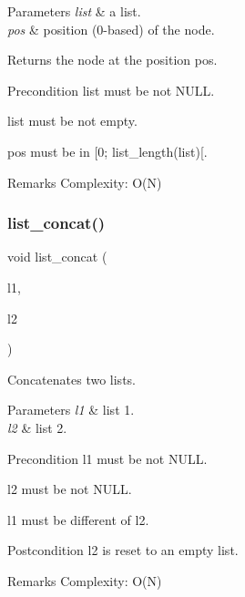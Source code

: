 \begin{DoxyParams}{Parameters}
{\em list} & a list. \\
\hline
{\em pos} & position (0-\/based) of the node. \\
\hline
\end{DoxyParams}
\begin{DoxyReturn}{Returns}
the node at the position {\ttfamily pos}.
\end{DoxyReturn}
\begin{DoxyPrecond}{Precondition}
{\ttfamily list} must be not N\+U\+LL. 

{\ttfamily list} must be not empty. 

{\ttfamily pos} must be in [0; list\+\_\+length(list)[.
\end{DoxyPrecond}
\begin{DoxyRemark}{Remarks}
Complexity\+: O(\+N) 
\end{DoxyRemark}
\mbox{\label{list_8h_af71fffc666f138957b1e015fdae5fe1f}} 
\subsubsection{list\+\_\+concat()}
{\footnotesize\ttfamily void list\+\_\+concat (\begin{DoxyParamCaption}\item[{struct \textbf{ list} $\ast$}]{l1,  }\item[{struct \textbf{ list} $\ast$}]{l2 }\end{DoxyParamCaption})\hspace{0.3cm}{\ttfamily [inline]}}

Concatenates two lists.


\begin{DoxyParams}{Parameters}
{\em l1} & list 1. \\
\hline
{\em l2} & list 2.\\
\hline
\end{DoxyParams}
\begin{DoxyPrecond}{Precondition}
{\ttfamily l1} must be not N\+U\+LL. 

{\ttfamily l2} must be not N\+U\+LL. 

{\ttfamily l1} must be different of {\ttfamily l2}.
\end{DoxyPrecond}
\begin{DoxyPostcond}{Postcondition}
{\ttfamily l2} is reset to an empty list.
\end{DoxyPostcond}
\begin{DoxyRemark}{Remarks}
Complexity\+: O(\+N) 
\end{DoxyRemark}
\mbox{\label{list_8h_a4ee9116bc5b8f1b5da93f415d8529d58}} 
